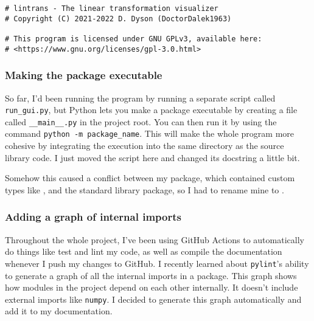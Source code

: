 \documentclass[../development.tex]{subfiles}
\begin{document}
\begin{verbatim}
# lintrans - The linear transformation visualizer
# Copyright (C) 2021-2022 D. Dyson (DoctorDalek1963)

# This program is licensed under GNU GPLv3, available here:
# <https://www.gnu.org/licenses/gpl-3.0.html>
\end{verbatim}

\subsubsection{Making the package executable\label{development:fumbling-with-semver:making-the-package-executable}}

So far, I'd been running the program by running a separate script called \texttt{run_gui.py}, but Python lets you make a package executable by creating a file called \texttt{__main__.py} in the project root. You can then run it by using the command \texttt{python -m package_name}. This will make the whole program more cohesive by integrating the execution into the same directory as the source library code. I just moved the script here and changed its docstring a little bit.


Somehow this caused a conflict between my  package, which contained custom types like , and the standard library  package, so I had to rename mine to .

\subsubsection{Adding a graph of internal imports\label{development:fumbling-with-semver:adding-a-graph-of-internal-imports}}

Throughout the whole project, I've been using GitHub Actions\cite{github-actions-docs} to automatically do things like test and lint my code, as well as compile the documentation whenever I push my changes to GitHub. I recently learned about \texttt{pylint}'s ability to generate a graph of all the internal imports in a package\cite{pylint-2.12.2-graph-docs}. This graph shows how modules in the project depend on each other internally. It doesn't include external imports like \texttt{numpy}. I decided to generate this graph automatically and add it to my documentation.

\end{document}
